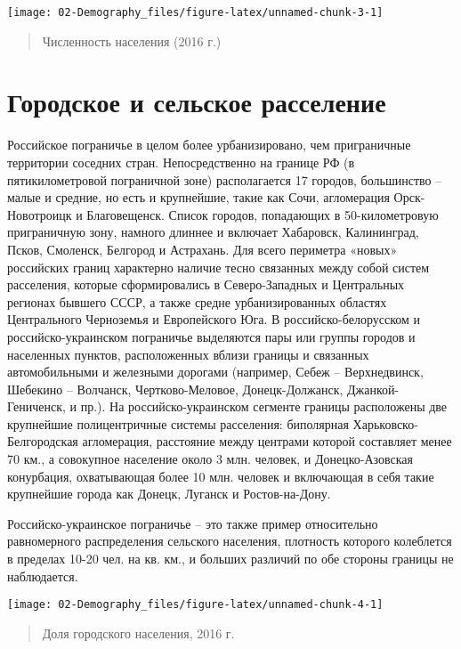 \documentclass[]{book}
\begin{document}
\texttt{[image: 02-Demography\_files/figure-latex/unnamed-chunk-3-1]}

\begin{quote}
Численность населения (2016 г.)
\end{quote}

\section{Городское и сельское расселение}\label{demo-urban}

Российское пограничье в целом более урбанизировано, чем приграничные
территории соседних стран. Непосредственно на границе РФ (в
пятикилометровой пограничной зоне) располагается 17 городов, большинство
-- малые и средние, но есть и крупнейшие, такие как Сочи, агломерация
Орск-Новотроицк и Благовещенск. Список городов, попадающих в
50-километровую приграничную зону, намного длиннее и включает Хабаровск,
Калининград, Псков, Смоленск, Белгород и Астрахань. Для всего периметра
«новых» российских границ характерно наличие тесно связанных между собой
систем расселения, которые сформировались в Северо-Западных и
Центральных регионах бывшего СССР, а также средне урбанизированных
областях Центрального Черноземья и Европейского Юга. В
российско-белорусском и российско-украинском пограничье выделяются пары
или группы городов и населенных пунктов, расположенных вблизи границы и
связанных автомобильными и железными дорогами (например, Себеж --
Верхнедвинск, Шебекино -- Волчанск, Чертково-Меловое, Донецк-Должанск,
Джанкой-Гениченск, и пр.). На российско-украинском сегменте границы
расположены две крупнейшие полицентричные системы расселения: биполярная
Харьковско-Белгородская агломерация, расстояние между центрами которой
составляет менее 70 км., а совокупное население около 3 млн. человек, и
Донецко-Азовская конурбация, охватывающая более 10 млн. человек и
включающая в себя такие крупнейшие города как Донецк, Луганск и
Ростов-на-Дону.

Российско-украинское пограничье -- это также пример относительно
равномерного распределения сельского населения, плотность которого
колеблется в пределах 10-20 чел. на кв. км., и больших различий по обе
стороны границы не наблюдается.

\texttt{[image: 02-Demography\_files/figure-latex/unnamed-chunk-4-1]}

\begin{quote}
Доля городского населения, 2016 г.
\end{quote}
\end{document}
